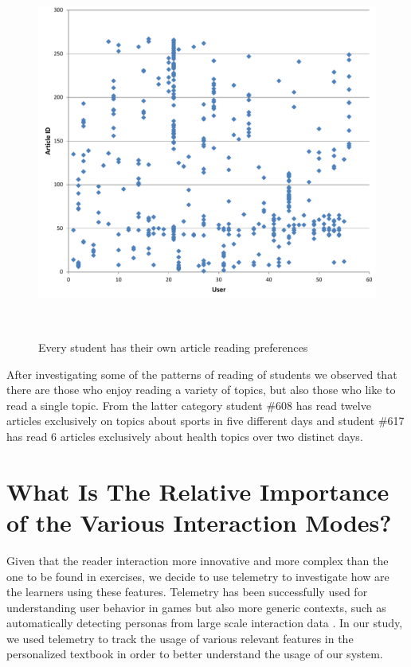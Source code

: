 
\begin{figure}[h!]
\centering
  \includegraphics[width=0.6\columnwidth]{figures/users_articles}
  \caption{Every student has their own article reading preferences}~\label{fig:articles_read}
\end{figure}


  After investigating some of the patterns of reading of students we observed that there are those who enjoy reading a variety of topics, but also those who like to read a single topic. 
  From the latter category student \#608 has read twelve articles exclusively on topics about sports in five different days and student \#617 has read 6 articles exclusively about health topics over two distinct days.
  

\newpage
\section{What Is The Relative Importance of the Various Interaction Modes?}
\newcommand{\feature}[1]{{\em #1}}
Given that the reader interaction more innovative and more complex than the one to be found in exercises, we decide to use telemetry to investigate how are the learners using these features. Telemetry has been successfully used for understanding user behavior in games \cite{Gagne11-telemetry} but also more generic contexts, such as automatically detecting personas from large scale interaction data \cite{Zhang16-telemetry}. In our study, we used telemetry to track the usage of various relevant features in the personalized textbook in order to better understand the usage of our system.

